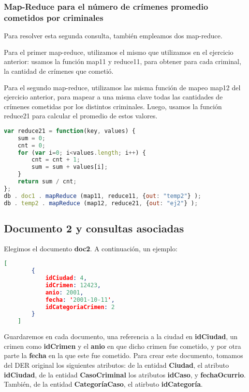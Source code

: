\documentclass[11pt, a4paper]{article}
\begin{document}
\subsubsection{Map-Reduce para el número de crímenes promedio cometidos por criminales}

Para resolver esta segunda consulta, también empleamos dos map-reduce. 

Para el primer map-reduce, utilizamos el mismo que utilizamos en el ejercicio anterior: usamos la función map11 y reduce11, para obtener para cada criminal, la cantidad de crímenes que cometió. 

Para el segundo map-reduce, utilizamos las misma función de mapeo map12 del ejercicio anterior, para mapear a una misma clave todas las cantidades de crímenes cometidas por los distintos criminales. Luego, usamos la función reduce21 para calcular el promedio de estos valores.

\begin{lstlisting}[language=JavaScript]
var reduce21 = function(key, values) {
    sum = 0;
    cnt = 0;
    for (var i=0; i<values.length; i++) {
        cnt = cnt + 1;
        sum = sum + values[i];
    }
    return sum / cnt;
};
db . doc1 . mapReduce (map11, reduce11, {out: "temp2"} );
db . temp2 . mapReduce (map12, reduce21, {out: "ej2"} );
\end{lstlisting}


\subsection{Documento 2 y consultas asociadas}

Elegimos el documento \textbf{doc2}. A continuación, un ejemplo:\

\begin{lstlisting}[language=json]
	[
		{
			idCiudad: 4,
			idCrimen: 12423,
			anio: 2001,
			fecha: '2001-10-11',
			idCategoriaCrimen: 2
		}
	]
\end{lstlisting}

Guardaremos en cada documento,  una referencia a la ciudad en \textbf{idCiudad}, un crimen como \textbf{idCrimen} y el \textbf{anio} en que dicho crimen fue cometido, y por otra parte la \textbf{fecha} en la que este fue cometido. Para crear este documento, tomamos del DER original los siguientes atributos: de la entidad \textbf{Ciudad}, el atributo \textbf{idCiudad}, de la entidad \textbf{CasoCriminal} los atributos \textbf{idCaso}, y \textbf{fechaOcurrio}. También, de la entidad \textbf{CategoríaCaso}, el atirbuto \textbf{idCategoría}. \
\end{document}
